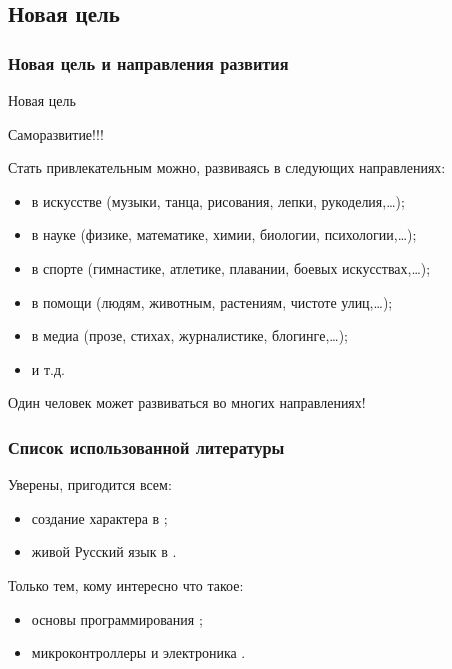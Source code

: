     
\subsection{Новая цель}

\begin{frame}
    \frametitle{Новая цель и направления развития}
    
    \begin{block}{Новая цель}
        \begin{center}
            \alert{Саморазвитие}!!!
        \end{center}
    \end{block}
    
    Стать \alert{привлекательным} можно, развиваясь в следующих направлениях:
    \begin{itemize}
        \item в искусстве (музыки, танца, рисования, лепки, рукоделия,\ldots);
        \item в науке (физике, математике, химии, биологии, психологии,\ldots);
        \item в спорте (гимнастике, атлетике, плавании, боевых искусствах,\ldots);
        \item в помощи (людям, животным, растениям, чистоте улиц,\ldots);
        \item в медиа (прозе, стихах, журналистике, блогинге,\ldots);
        \item и т.д.
    \end{itemize}
    
    \begin{block}{}
        \begin{center}
            \alert{Один} человек может развиваться во \alert{многих} направлениях!
        \end{center}
    \end{block}
    
\end{frame}


\appendix

\begin{frame}
    \frametitle{Список использованной литературы}

    Уверены, пригодится \alert{всем}:
    \begin{itemize}
        \item создание характера в \cite{bib:kovey:sevenHabits};
        \item живой Русский язык в \cite{bib:gal:WordLiveAndDeath}.
    \end{itemize}
    
    \par\bigskip
    
    Только тем, кому интересно что такое:
    \begin{itemize}
        \item основы программирования \cite{bib:kernigan:practice};
        \item микроконтроллеры и электроника \cite{bib:petin:Arduino}.
    \end{itemize}
\end{frame}

